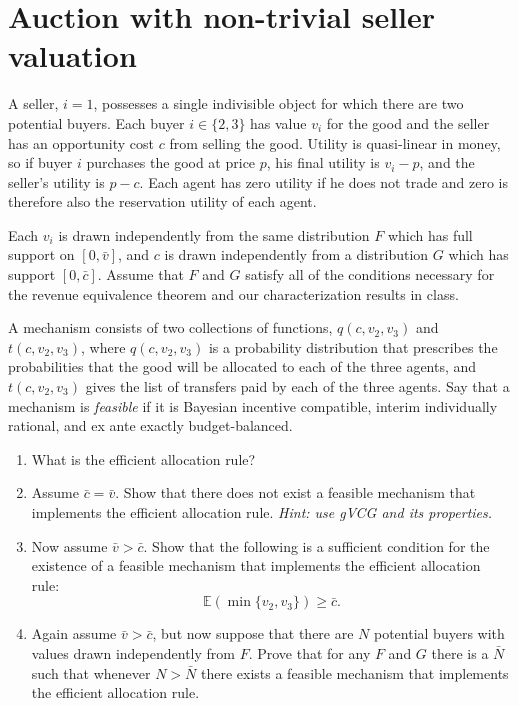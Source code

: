 \documentclass[a4paper]{article}
\begin{document}
\fi
	


\section{Auction with non-trivial seller valuation}
	A seller, $i=1$, possesses a single indivisible object for which there are two potential buyers. Each buyer $i \in \{2,3\}$ has value $v_i$ for the good and the seller has an opportunity cost $c$ from selling the good.  Utility is quasi-linear in money, so if buyer $i$ purchases the good at price $p$, his final utility is $v_i-p$, and the seller's utility is $p-c$. Each agent has zero utility if he does not trade and zero is therefore also the reservation utility of each agent.
	
	Each $v_i$ is drawn independently from the same distribution $F$ which has full support on $[0,\bar v]$, and $c$ is drawn independently from a distribution $G$ which has support $[0,\bar c]$.  Assume that $F$ and $G$ satisfy all of the conditions necessary for the revenue
	equivalence theorem and our characterization results in class.
	
	\medskip
	A mechanism consists of two collections of functions, $q(c, v_2, v_3)$ and $t(c, v_2, v_3)$, where $q(c, v_2, v_3)$ is a probability distribution that prescribes the probabilities that the good will be allocated to each of the three agents, and $t(c, v_2, v_3)$ gives the list of transfers paid by each of the three agents.
	Say that a mechanism is \emph{feasible} if it is Bayesian incentive compatible, interim individually rational, and ex ante exactly budget-balanced.
	
	\begin{enumerate}
		\item What is the efficient allocation rule?
		
		\item Assume $\bar c = \bar v$.  Show that there does not exist a feasible mechanism that implements the efficient allocation rule. \emph{Hint: use gVCG and its properties.}
		
		\item Now assume $\bar v > \bar c$.  Show that the following is a sufficient condition for the existence of a feasible mechanism that implements the efficient allocation rule:
		$$ \mathbb{E}(\min\{v_2, v_3\}) \geq \bar c. $$
		\item Again assume $\bar{v} > \bar{c}$, but now suppose that there are $N$ potential buyers with values drawn independently from $F$.  Prove that for any $F$ and $G$ there is a $\bar N$ such that whenever $N > \bar{N}$  there exists a feasible mechanism that
		implements the efficient allocation rule.
	\end{enumerate}
	
\end{document}
